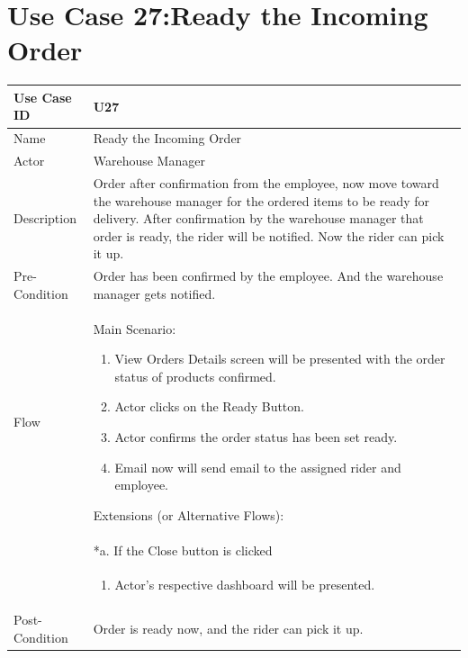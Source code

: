 \documentclass[12pt,a4paper]{report}
\begin{document}
\section{Use Case 27:Ready the Incoming Order}

\begin{tabular}{ | m{3cm} | m{12cm}| } \hline


Use Case ID &  U27 \\\hline
Name  	    &  Ready the Incoming Order \\ \hline
Actor     	& Warehouse Manager \\ \hline
Description  & Order after confirmation from the employee, now move toward the warehouse manager for the ordered items to be ready for delivery. After confirmation by the warehouse manager that order is ready, the rider will be notified. Now the rider can pick it up.\\ \hline
Pre-Condition & Order has been confirmed by the employee. And the warehouse manager gets notified. \\ \hline
Flow & Main Scenario:
\begin{enumerate}
\item View Orders Details screen will be presented with the order status of products confirmed.

\item Actor clicks on the Ready Button.

\item Actor confirms the order status has been set ready.

\item Email now will send email to the assigned rider and employee.

\end{enumerate}
Extensions (or Alternative Flows):\\

& *a. If the Close button is clicked \\

& \begin{enumerate}

		\item Actor's respective dashboard will be presented.

	\end{enumerate}

\\ \hline

Post-Condition &  Order is ready now, and the rider can pick it up.\\ \hline

\end{tabular}
\end{document}
